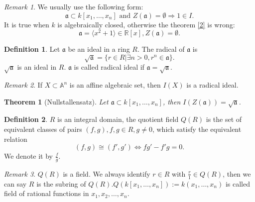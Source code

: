 \documentclass{amsart}
\theoremstyle{plain}
\newtheorem{theorem}{Theorem}
\theoremstyle{definition}
\newtheorem{definition}{Definition}
\theoremstyle{remark}
\newtheorem*{remark}{Remark}
\numberwithin{equation}{section}
\begin{document}
\begin{remark}
	We usually use the following form:
	$$
	\mathfrak{a}\subset k[x_1,\dots,x_n] \text{ and } Z(\mathfrak{a})=\emptyset\Rightarrow 1\in I.
	$$
	It is true when $ k $ is algebraically closed, otherwise the theorem \ref{2} is wrong:
	$$
	\mathfrak{a}=\langle x^2+1\rangle \in \mathbb{R}[x], Z(\mathfrak{a})=\emptyset.
	$$
\end{remark}
\begin{definition}
	Let $ \mathfrak{a} $ be an ideal in a ring $ R $. The radical of $ \mathfrak{a} $ is 
	$$
	\sqrt{\mathfrak{a}}=\{ r\in R|\exists n>0, r^n\in \mathfrak{a} \}.
	$$
	$ \sqrt{\mathfrak{a}} $ is an ideal in $ R $.
	$ \mathfrak{a} $ is called radical ideal if $ \mathfrak{a}=\sqrt{\mathfrak{a}} $.
\end{definition}
\begin{remark}
	If $ X\subset \mathbb{A}^n $ is an affine algebraic set, then $ I(X) $ is a radical ideal.
\end{remark}
\begin{theorem}[Nullstallensatz]
	Let $ \mathfrak{a}\subset k[x_1,\dots,x_n] $, then $ I(Z(\mathfrak{a}))=\sqrt{\mathfrak{a}} $.
\end{theorem}
\begin{definition}
	$ R $ is an integral domain, the quotient field $ Q(R) $ is the set of equivalent classes of pairs $ (f,g), f,g\in R, g\neq 0 $, which satisfy the equivalent relation
	$$
	(f,g)\cong (f',g') \Leftrightarrow fg'-f'g=0.
	$$
	We denote it by $ \frac{f}{g} $. 
\end{definition}
\begin{remark}
	$ Q(R) $ is a field. We always identify $ r\in R $ with $ \frac{r}{1}\in Q(R) $, then we can say $ R $ is the subring of $ Q(R) $.$ Q(k[x_1,\dots,x_n]):=k(x_1,\dots,x_n) $ is called field of rational functions in $ x_1,x_2,\dots,x_n $.
\end{remark}
\end{document}
